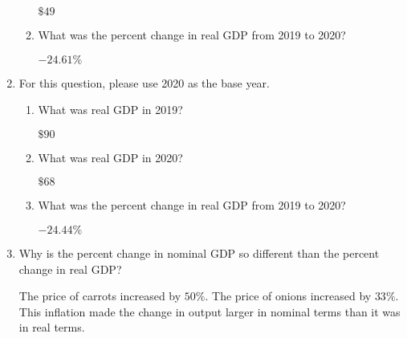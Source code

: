 \documentclass{assignment}
\begin{document}
\begin{enumerate}
\begin{enumerate}
\begin{solution}
$\$49$
\end{solution}

\vspace{-6pt}
\item What was the percent change in real GDP from 2019 to 2020?

\begin{solution}
$-24.61\%$
\end{solution}

\end{enumerate}

\vspace{-6pt}
\item For this question, please use 2020 as the base year.

\begin{enumerate}

\vspace{-6pt}
\item What was real GDP in 2019?

\begin{solution}
$\$90$
\end{solution}

\vspace{-6pt}
\item What was real GDP in 2020?

\begin{solution}
$\$68$
\end{solution}

\vspace{-6pt}
\item What was the percent change in real GDP from 2019 to 2020?

\begin{solution}
$-24.44\%$
\end{solution}

\end{enumerate}

\vspace{-6pt}
\item Why is the percent change in nominal GDP so different than the percent change in real GDP?

\begin{solution}
The price of carrots increased by $50\%$. The price of onions increased by $33\%$. This inflation made the change in output larger in nominal terms than it was in real terms.
\end{solution}

\end{enumerate}
\end{document}
